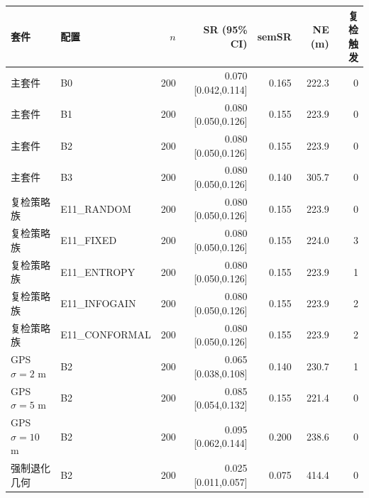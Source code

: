 \begin{tabular}{llrrrrr}
\hline
套件 & 配置 & $n$ & SR (95\% CI) & semSR & NE (m) & 复检触发 \\
\hline
主套件 & B0 & 200 & 0.070 [0.042,0.114] & 0.165 & 222.3 & 0 \\
主套件 & B1 & 200 & 0.080 [0.050,0.126] & 0.155 & 223.9 & 0 \\
主套件 & B2 & 200 & 0.080 [0.050,0.126] & 0.155 & 223.9 & 0 \\
主套件 & B3 & 200 & 0.080 [0.050,0.126] & 0.140 & 305.7 & 0 \\
复检策略族 & E11\_RANDOM & 200 & 0.080 [0.050,0.126] & 0.155 & 223.9 & 0 \\
复检策略族 & E11\_FIXED & 200 & 0.080 [0.050,0.126] & 0.155 & 224.0 & 3 \\
复检策略族 & E11\_ENTROPY & 200 & 0.080 [0.050,0.126] & 0.155 & 223.9 & 1 \\
复检策略族 & E11\_INFOGAIN & 200 & 0.080 [0.050,0.126] & 0.155 & 223.9 & 2 \\
复检策略族 & E11\_CONFORMAL & 200 & 0.080 [0.050,0.126] & 0.155 & 223.9 & 2 \\
GPS $\sigma{=}2$ m & B2 & 200 & 0.065 [0.038,0.108] & 0.140 & 230.7 & 1 \\
GPS $\sigma{=}5$ m & B2 & 200 & 0.085 [0.054,0.132] & 0.155 & 221.4 & 0 \\
GPS $\sigma{=}10$ m & B2 & 200 & 0.095 [0.062,0.144] & 0.200 & 238.6 & 0 \\
强制退化几何 & B2 & 200 & 0.025 [0.011,0.057] & 0.075 & 414.4 & 0 \\
\hline
\end{tabular}
